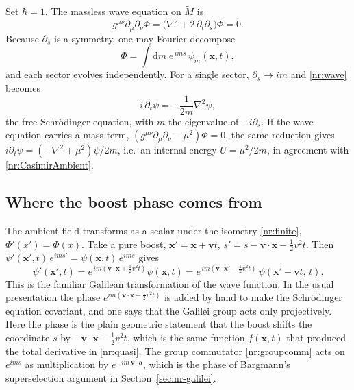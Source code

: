 Set $\hbar=1$. The massless wave equation on $\tilde M$ is
\begin{equation}
  g^{\mu\nu}\partial_\mu\partial_\nu\Phi=\bigl(\nabla^2+2\,\partial_t\partial_s\bigr)\Phi=0 .
  \label{nr:wave}
\end{equation}
Because $\partial_s$ is a symmetry, one may Fourier-decompose
\begin{equation}
  \Phi=\int\mathrm{d}m\;e^{\,ims}\,\psi_m(\mathbf{x},t),
\end{equation}
and each sector evolves independently. For a single sector, $\partial_s\to im$ and \eqref{nr:wave} becomes
\begin{equation}
  i\,\partial_t\psi=-\frac{1}{2m}\nabla^2\psi ,
  \label{nr:schrodinger}
\end{equation}
the free Schr\"odinger equation, with $m$ the eigenvalue of $-i\partial_s$. If
the wave equation carries a mass term, $(g^{\mu\nu}\partial_\mu\partial_\nu-\mu^2)\Phi=0$,
the same reduction gives $i\partial_t\psi=(-\nabla^2+\mu^2)\psi/2m$, i.e.\ an
internal energy $U=\mu^2/2m$, in agreement with \eqref{nr:CasimirAmbient}.

\subsection{Where the boost phase comes from}

The ambient field transforms as a scalar under the isometry \eqref{nr:finite},
$\Phi'(x')=\Phi(x)$. Take a pure boost, $\mathbf{x}'=\mathbf{x}+\mathbf{v}t$,
$s'=s-\mathbf{v}\cdot\mathbf{x}-\tfrac12v^2t$. Then
$\psi'(\mathbf{x}',t)\,e^{ims'}=\psi(\mathbf{x},t)\,e^{ims}$ gives
\begin{equation}
  \psi'(\mathbf{x}',t)
  =e^{\,im(\mathbf{v}\cdot\mathbf{x}+\frac12v^2t)}\psi(\mathbf{x},t)
  =e^{\,im(\mathbf{v}\cdot\mathbf{x}'-\frac12v^2t)}\,\psi(\mathbf{x}'-\mathbf{v}t,\,t).
  \label{nr:boostphase}
\end{equation}
This is the familiar Galilean transformation of the wave function. In the usual
presentation the phase $e^{im(\mathbf{v}\cdot\mathbf{x}-\frac12v^2t)}$ is
added by hand to make the Schr\"odinger equation covariant, and one says that
the Galilei group acts only projectively. Here the phase is the plain geometric
statement that the boost shifts the coordinate $s$ by
$-\mathbf{v}\cdot\mathbf{x}-\tfrac12v^2t$, which is the same function
$f(\mathbf{x},t)$ that produced the total derivative in \eqref{nr:quasi}. The
group commutator \eqref{nr:groupcomm} acts on $e^{ims}$ as multiplication by
$e^{-im\,\mathbf{v}\cdot\mathbf{a}}$, which is the phase of Bargmann's
superselection argument in Section~\ref{sec:nr-galilei}.

